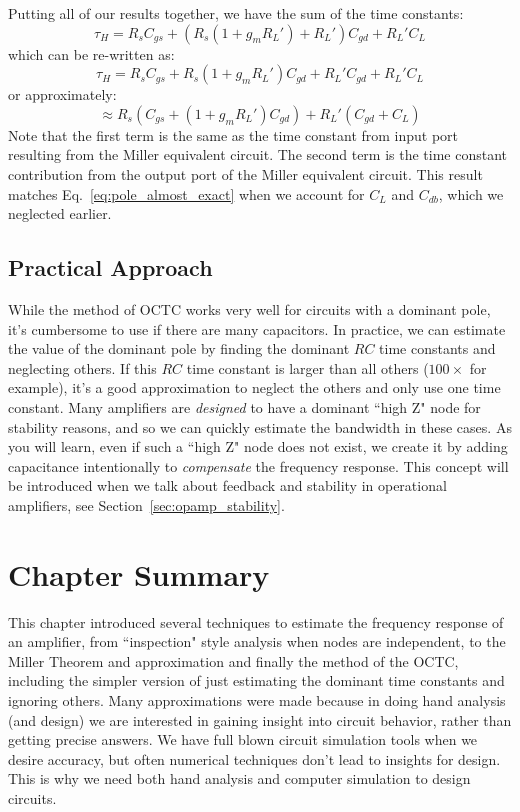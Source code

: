 Putting all of our results together, we have the sum of the time constants:
%
\begin{equation} 
	{\tau _H} = R_s{C_{gs}} + \left( {R_s(1 + {g_m}R_L') + R_L'} \right){C_{gd}} + R_L'{C_L}
\end{equation}
%
which can be re-written as:
\begin{equation} 
	{\tau _H} = R_s{C_{gs}} + R_s(1 + {g_m}R_L'){C_{gd}} + R_L'{C_{gd}} + R_L'{C_L} 
\end{equation}
%
or approximately:
\begin{equation} 
	 \approx R_s\left( {{C_{gs}} + (1 + {g_m}R_L'){C_{gd}}} \right) + R_L'\left( {{C_{gd}} + {C_L}} \right)
\end{equation}
%
Note that the first term is the same as the time constant from input port resulting from the Miller equivalent circuit.  The second term is the time constant contribution from the output port of the Miller equivalent circuit.  This result matches Eq.~\ref{eq:pole_almost_exact} when we account for $C_L$ and $C_{db}$, which we neglected earlier.
 



\subsection{Practical Approach}

While the method of OCTC works very well for circuits with a dominant pole, it's cumbersome to use if there are many capacitors.  In practice, we can estimate the value of the dominant pole by finding the dominant $RC$ time constants and neglecting others.  If this $RC$ time constant is larger than all others ($100\times$ for example), it's a good approximation to neglect the others and only use one time constant. Many amplifiers are \textit{designed} to have a dominant ``high Z" node for stability reasons, and so we can quickly estimate the bandwidth in these cases.  As you will learn, even if such a ``high Z" node does not exist, we create it by adding capacitance intentionally to \textit{compensate} the frequency response.  This concept will be introduced when we talk about feedback and stability in operational amplifiers, see Section~\ref{sec:opamp_stability}.
 

\section{Chapter Summary}

This chapter introduced several techniques to estimate the frequency response of an amplifier, from ``inspection" style analysis when nodes are independent, to the Miller Theorem and approximation and finally the method of the OCTC, including the simpler version of just estimating the dominant time constants and ignoring others.  Many approximations were made because in doing hand analysis (and design) we are interested in gaining insight into circuit behavior, rather than getting precise answers.  We have full blown circuit simulation tools when we desire accuracy, but often numerical techniques don't lead to insights for design.  This is why we need both hand analysis and computer simulation to design circuits.




